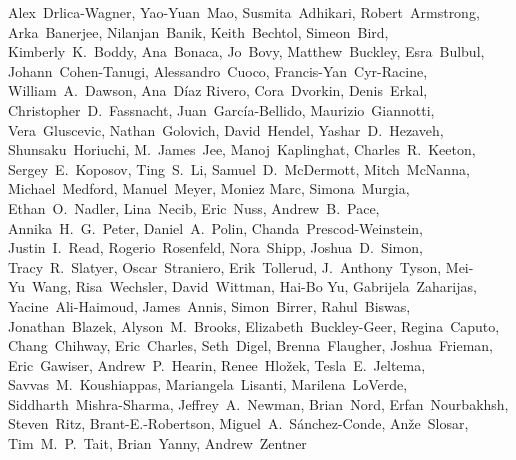 \begin{raggedright}
Alex~Drlica-Wagner,
Yao-Yuan~Mao,
Susmita~Adhikari,
Robert~Armstrong,
Arka~Banerjee,
Nilanjan~Banik,
Keith~Bechtol,
Simeon~Bird,
Kimberly~K.~Boddy,
Ana~Bonaca,
Jo~Bovy,
Matthew~Buckley,
Esra~Bulbul,
Johann~Cohen-Tanugi,
Alessandro~Cuoco,
Francis-Yan~Cyr-Racine,
William~A.~Dawson,
Ana~D\'{i}az Rivero,
Cora~Dvorkin,
Denis~Erkal,
Christopher~D.~Fassnacht,
Juan~Garc\'ia-Bellido,
Maurizio~Giannotti,
Vera~Gluscevic,
Nathan~Golovich,
David~Hendel,
Yashar~D.~Hezaveh,
Shunsaku~Horiuchi,
M.~James~Jee,
Manoj~Kaplinghat,
Charles~R.~Keeton,
Sergey~E.~Koposov,
Ting~S.~Li,
Samuel~D.~McDermott,
Mitch~McNanna,
Michael~Medford,
Manuel~Meyer,
Moniez Marc,
Simona~Murgia,
Ethan~O.~Nadler,
Lina~Necib,
Eric~Nuss,
Andrew~B.~Pace,
Annika~H.~G.~Peter,
Daniel~A.~Polin,
Chanda~Prescod-Weinstein,
Justin~I.~Read,
Rogerio~Rosenfeld,
Nora~Shipp,
Joshua~D.~Simon,
Tracy~R.~Slatyer,
Oscar~Straniero,
Erik~Tollerud,
J.~Anthony~Tyson,
Mei-Yu~Wang,
Risa~Wechsler,
David~Wittman,
Hai-Bo Yu,
Gabrijela~Zaharijas,
Yacine~Ali-Ha\:imoud,
James~Annis,
Simon~Birrer,
Rahul~Biswas,
Jonathan~Blazek,
Alyson~M.~Brooks,
Elizabeth~Buckley-Geer,
Regina~Caputo,
Chang~Chihway,
Eric~Charles,
Seth~Digel,
Brenna~Flaugher,
Joshua~Frieman,
Eric~Gawiser,
Andrew~P.~Hearin,
Renee~Hlo\v{z}ek,
Tesla~E.~Jeltema,
Savvas~M.~Koushiappas,
Mariangela~Lisanti,
Marilena~LoVerde,
Siddharth~Mishra-Sharma,
Jeffrey~A.~Newman,
Brian~Nord,
Erfan~Nourbakhsh,
Steven~Ritz,
Brant-E.-Robertson,
Miguel~A.~S\'anchez-Conde,
An\v{z}e~Slosar,
Tim~M.~P.~Tait,
Brian~Yanny,
Andrew~Zentner


\end{raggedright}
